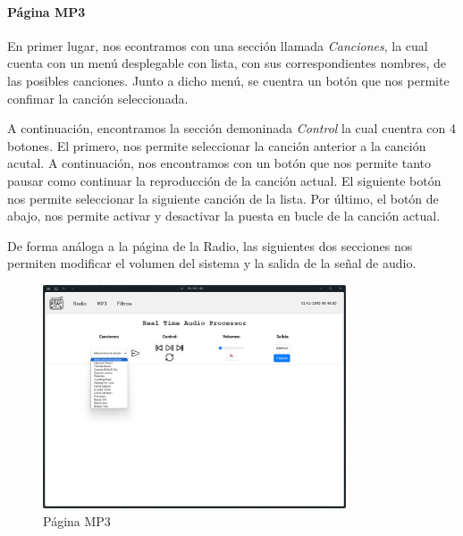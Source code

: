 \paragraph{Página MP3}
En primer lugar, nos econtramos con una sección llamada \textit{Canciones}, la cual cuenta con un menú desplegable con lista, con sus correspondientes nombres, de las posibles canciones. Junto a dicho menú, se cuentra un botón que nos permite confimar la canción seleccionada.

A continuación, encontramos la sección demoninada \textit{Control} la cual cuentra con 4 botones. El primero, nos permite seleccionar la canción anterior a la canción acutal. A continuación, nos encontramos con un botón que nos permite tanto pausar como continuar la reproducción de la canción actual. El siguiente botón nos permite seleccionar la siguiente canción de la lista. Por último, el botón de abajo, nos permite activar y desactivar la puesta en bucle de la canción actual.

De forma análoga a la página de la Radio, las siguientes dos secciones nos permiten modificar el volumen del sistema y la salida de la señal de audio.

\begin{figure}[H]
    \centering
    \includegraphics[width=0.8\textwidth]{images/3/3-1/3-1-1-3/Pagina_MP3.png}
    \caption{Página MP3}
    \label{fig:3-1-1-3-MP3}
\end{figure}